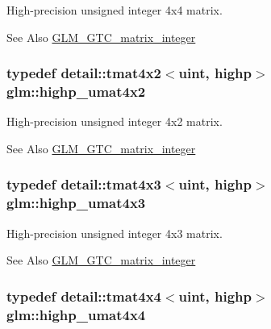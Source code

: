 High-\/precision unsigned integer 4x4 matrix. \begin{DoxySeeAlso}{See Also}
\hyperlink{group__gtc__matrix__integer}{G\-L\-M\-\_\-\-G\-T\-C\-\_\-matrix\-\_\-integer} 
\end{DoxySeeAlso}
\hypertarget{group__gtc__matrix__integer_ga32442efcb778cb80024a17bafa781f81}{
\subsubsection[{highp\-\_\-umat4x2}]{\setlength{\rightskip}{0pt plus 5cm}typedef detail\-::tmat4x2$<$uint, highp$>$ {\bf glm\-::highp\-\_\-umat4x2}}}\label{group__gtc__matrix__integer_ga32442efcb778cb80024a17bafa781f81}
High-\/precision unsigned integer 4x2 matrix. \begin{DoxySeeAlso}{See Also}
\hyperlink{group__gtc__matrix__integer}{G\-L\-M\-\_\-\-G\-T\-C\-\_\-matrix\-\_\-integer} 
\end{DoxySeeAlso}
\hypertarget{group__gtc__matrix__integer_ga763a36c57b6073ca3cac739bfbe794ba}{
\subsubsection[{highp\-\_\-umat4x3}]{\setlength{\rightskip}{0pt plus 5cm}typedef detail\-::tmat4x3$<$uint, highp$>$ {\bf glm\-::highp\-\_\-umat4x3}}}\label{group__gtc__matrix__integer_ga763a36c57b6073ca3cac739bfbe794ba}
High-\/precision unsigned integer 4x3 matrix. \begin{DoxySeeAlso}{See Also}
\hyperlink{group__gtc__matrix__integer}{G\-L\-M\-\_\-\-G\-T\-C\-\_\-matrix\-\_\-integer} 
\end{DoxySeeAlso}
\hypertarget{group__gtc__matrix__integer_gaa14b7029cfaf6f26384782f5ff7acddf}{
\subsubsection[{highp\-\_\-umat4x4}]{\setlength{\rightskip}{0pt plus 5cm}typedef detail\-::tmat4x4$<$uint, highp$>$ {\bf glm\-::highp\-\_\-umat4x4}}}\label{group__gtc__matrix__integer_gaa14b7029cfaf6f26384782f5ff7acddf}
